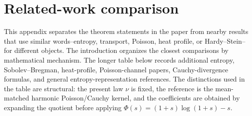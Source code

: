 \section{Related-work comparison}%
\label{app:related-work-scope}

This appendix separates the theorem statements in the paper from nearby
results that use similar words--entropy, transport, Poisson, heat profile,
or Hardy--Stein--for different objects.  The introduction organizes the
closest comparisons by mathematical mechanism.  The longer table below
records additional entropy, Sobolev--Bregman, heat-profile,
Poisson-channel papers, Cauchy-divergence formulas, and general
entropy-representation references.  The distinctions used in the table are
structural: the present law \(\nu\) is fixed, the reference is the
mean-matched harmonic Poisson/Cauchy kernel, and the coefficients are obtained
by expanding the quotient before applying
\(\Phi(s)=(1+s)\log(1+s)-s\).

